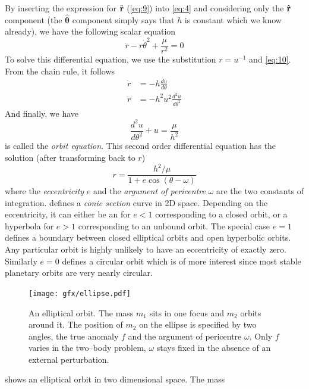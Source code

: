\documentclass[twoside,openright,titlepage,numbers=noenddot,headinclude,%
                footinclude=true,cleardoublepage=empty,abstractoff, 
                BCOR=5mm,paper=a4,fontsize=11pt,%
                american,%
                ]{scrreprt}%
\begin{document}
By inserting the expression for $\ddot{\boldsymbol{\mathbf{r}}}$ (\cref{eq:9}) into \cref{eq:4} 
and considering only the $\boldsymbol{\mathbf{\hat r}}$ component (the $\boldsymbol{\hat\theta}$
component simply says that $h$ is constant which we know already), we have the following
scalar equation
\begin{equation}
\ddot{r}-r\dot{\theta}^2 + \frac{\mu}{r^2} =0
\end{equation}
To solve this differential equation, we use the substitution $r=u^{-1}$ and
\cref{eq:10}. From the chain rule, it follows
\begin{align}
    \dot{r}&=-h \frac{du}{d\theta} \\
    \ddot{r}&=-h^2u^2 \frac{d^2u}{d\theta^2} 
\end{align}
And finally, we have
\begin{equation}
    \frac{d^2u}{d\theta^2} +u= \frac{\mu}{h^2} 
    \label{eq:orbit_eq}
\end{equation}
 is called the \emph{orbit equation}. This second order 
differential equation has the solution (after transforming back to $r$)
\begin{equation}
    r = \frac{h^2/\mu}{1 + e\cos (\theta-\omega)} 
    \label{eq:orbit_eq_solution}
\end{equation}
where the \emph{eccentricity} $e$ and the \emph{argument of pericentre} $\omega$
are the two constants of integration.  defines 
a \emph{conic section} curve in 2D space. Depending on the eccentricity,
it can either be an for $e<1$ corresponding to a closed orbit, or
a hyperbola for $e>1$ corresponding to an unbound orbit. The special case
$e=1$ defines a boundary between closed elliptical orbits and open hyperbolic
orbits. Any
particular orbit is highly unlikely to have an eccentricity of exactly zero. 
Similarly $e=0$ defines a circular orbit which is of more interest since
most stable planetary orbits are very nearly circular.
\begin{figure}[htb]
\centering
\texttt{[image: gfx/ellipse.pdf]}
    \caption[Elliptical orbit.]{An elliptical orbit. The mass $m_1$ sits in one focus and $m_2$ orbits 
    around it. The position  of $m_2$ on the ellipse is specified by two angles, 
    the true anomaly $f$ and the argument of pericentre $\omega$. Only $f$ 
    varies in the two--body problem, $\omega$ stays fixed in the absence of an
    external perturbation.} 
\label{fig:ellipse}
\end{figure}
 shows an elliptical orbit in two dimensional space. The mass
\end{document}
